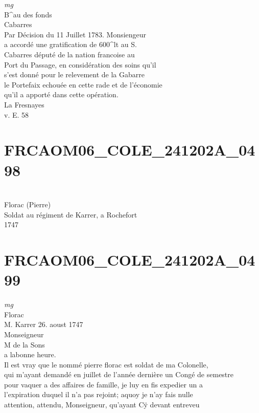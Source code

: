 \documentclass{article}
\begin{document}
\begin{pages}
\vspace{0.5cm}\noindent
\textit{mg}
\footnotesize \\
B\^{}au des fonds\\
Cabarres
\normalsize \pstart
\\
Par Décision du 11 Juillet 1783. Monsiengeur\\
a accordé une gratification de 600\^{}lt au S.\\
Cabarres député de la nation francoise au\\
Port du Passage, en considération des soins qu'il\\
s'est donné pour le relevement de la Gabarre\\
le Portefaix echouée en cette rade et de l'économie\\
qu'il a apporté dans cette opération.\\
La Fresnayes
\pend\pstart
\\
v. E. 58
\pend
\endnumbering\beginnumbering\section{FRCAOM06\_COLE\_241202A\_0498}\pstart
\\
Florac (Pierre)\\
Soldat au régiment de Karrer, a Rochefort\\
1747
\pend
\endnumbering\beginnumbering\section{FRCAOM06\_COLE\_241202A\_0499}
\vspace{0.5cm}\noindent
\textit{mg}
\footnotesize \\
Florac
\normalsize \pstart
\\
M. Karrer 26. aoust 1747\\
Monseigneur\\
M de la Sons\\
a labonne heure.
\pend\pstart
\\
Il est vray que le nommé pierre florac est soldat de ma Colonelle,\\
qui m'ayant demandé en juillet de l'année dernière un Congé de semestre\\
pour vaquer a des affaires de famille, je luy en fis expedier un a\\
l'expiration duquel il n'a pas rejoint; aquoy je n'ay fais nulle\\
attention, attendu, Monseigneur, qu'ayant Cÿ devant entreveu\\

\end{pages}
\end{document}
